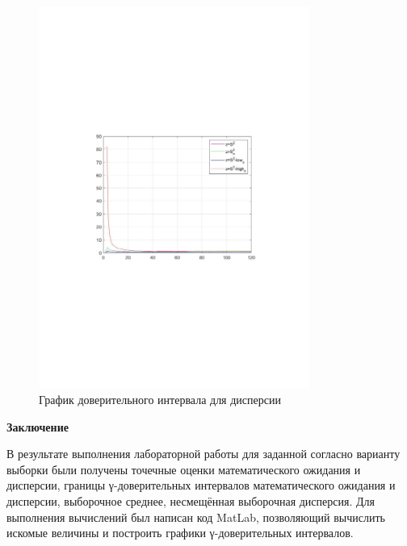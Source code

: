 \documentclass[12pt,a4paper]{scrartcl}
\begin{document}
\begin{figure}[H]
	\centering
	\includegraphics[width=335px]{1.pdf}
	\caption{График доверительного интервала для дисперсии}
	\label{graph2.2}
\end{figure}

\newpage
{}
\begin{center}
\textbf {Заключение}
\end{center}
В результате выполнения лабораторной работы для заданной согласно варианту выборки были получены точечные оценки математического ожидания и дисперсии, границы γ-доверительных интервалов математического ожидания и дисперсии, выборочное среднее, несмещённая выборочная дисперсия. Для выполнения вычислений был написан код MatLab, позволяющий вычислить искомые величины и построить графики γ-доверительных интервалов.
\end{document}
